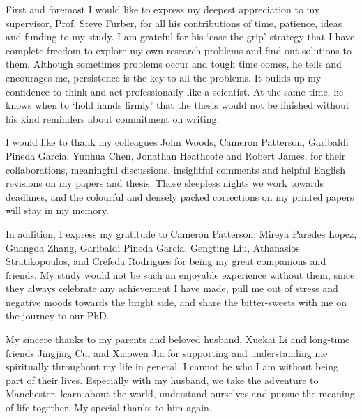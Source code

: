 First and foremost I would like to express my deepest appreciation to my supervisor, Prof. Steve Furber, for all his contributions of time, patience, ideas and funding to my study.
I am grateful for his `ease-the-grip' strategy that I have complete freedom to explore my own research problems and find out solutions to them.
Although sometimes problems occur and tough time comes, he tells and encourages me, persistence is the key to all the problems.
It builds up my confidence to think and act professionally like a scientist.
At the same time, he knows when to `hold hands firmly' that the thesis would not be finished without his kind reminders about commitment on writing.

I would like to thank my colleagues John Woods, Cameron Patterson, Garibaldi Pineda Garcia, Yunhua Chen, Jonathan Heathcote and Robert James, for their collaborations, meaningful discussions, insightful comments and helpful English revisions on my papers and thesis.
Those sleepless nights we work towards deadlines, and the colourful and densely packed corrections on my printed papers will stay in my memory.

In addition, I express my gratitude to Cameron Patterson, Mireya Paredes Lopez, Guangda Zhang, Garibaldi Pineda Garcia, Gengting Liu, Athanasios Stratikopoulos, and Crefeda Rodrigues for being my great companions and friends.
My study would not be such an enjoyable experience without them, since they always celebrate any achievement I have made, pull me out of stress and negative moods towards the bright side, and share the bitter-sweets with me on the journey to our PhD.

My sincere thanks to my parents and beloved husband, Xuekai Li and long-time friends Jingjing Cui and Xiaowen Jia for supporting and understanding me spiritually throughout my life in general.
I cannot be who I am without being part of their lives.
Especially with my husband, we take the adventure to Manchester, learn about the world, understand ourselves and pursue the meaning of life together.
My special thanks to him again. 
 
 	